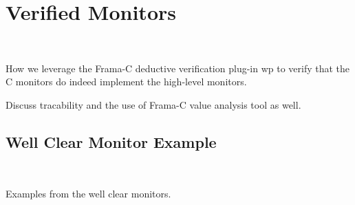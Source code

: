 \section{Verified Monitors}~\label{sec:vermon} 

How we leverage the Frama-C deductive verification plug-in wp to verify that the C monitors do indeed implement the high-level monitors.

Discuss tracability and  the use of Frama-C value analysis tool as well. 

\subsection{Well Clear Monitor Example}~\label{sec:verwcmon} 

Examples from the well clear monitors. 
